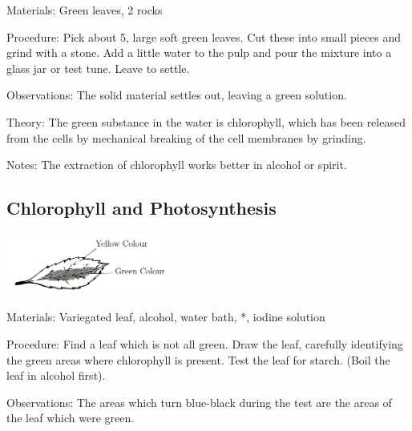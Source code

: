 \begin{multicols}{2}
\begin{description*}
\item[Materials:]{Green leaves, 2 rocks}
\item[Procedure:]{Pick about 5, large soft green leaves. Cut these into small pieces and grind with a stone.
Add a little water to the pulp and pour the mixture into a glass jar or test tune. Leave to settle.}
\item[Observations:]{The solid material settles out, leaving a green solution.}
\item[Theory:]{The green substance in the water is chlorophyll, which has been released from the cells by
mechanical breaking of the cell membranes by grinding.}
\item[Notes:]{The extraction of chlorophyll works better in alcohol or spirit.}
\end{description*}

\subsection{Chlorophyll and Photosynthesis} %

\begin{center}
\includegraphics[width=0.4\textwidth]{./img/variegated-leaf.png}
\end{center}

\begin{description*}
\item[Materials:]{Variegated leaf, alcohol, water bath, *, iodine solution}
\item[Procedure:]{Find a leaf which is not all green. Draw the
leaf, carefully identifying the
green areas where chlorophyll is
present. Test the leaf for starch.
(Boil the leaf in alcohol first).
}
\item[Observations:]{The areas which turn
blue-black during the test are the
areas of the leaf which were
green.}
\end{description*}


\end{multicols}
